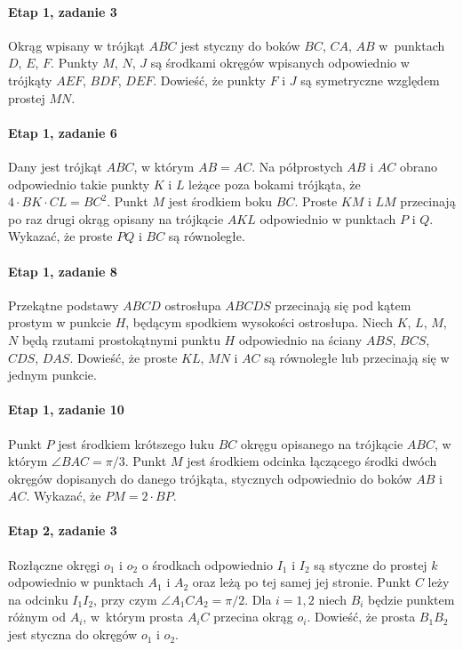 
\paragraph{Etap 1, zadanie 3}
Okrąg wpisany w trójkąt $ABC$ jest styczny do boków $BC$, $CA$, $AB$ w~punktach $D$, $E$, $F$.
Punkty $M$, $N$, $J$ są środkami okręgów wpisanych odpowiednio w trójkąty $AEF$, $BDF$, $DEF$.
Dowieść, że punkty $F$ i $J$ są symetryczne względem prostej $MN$.

\paragraph{Etap 1, zadanie 6}
Dany jest trójkąt $ABC$, w którym $AB = AC$. Na półprostych $AB$ i $AC$ obrano odpowiednio takie punkty $K$ i $L$ leżące poza bokami trójkąta, że $4 \cdot BK \cdot CL = BC^2$.
Punkt $M$ jest środkiem boku $BC$.
Proste $KM$ i $LM$ przecinają po raz drugi okrąg opisany na trójkącie $AKL$ odpowiednio w punktach $P$ i $Q$.
Wykazać, że proste $PQ$ i $BC$ są równoległe.

\paragraph{Etap 1, zadanie 8}
Przekątne podstawy $ABCD$ ostrosłupa $ABCDS$ przecinają się pod kątem prostym w punkcie $H$, będącym spodkiem wysokości ostrosłupa.
Niech $K$, $L$, $M$, $N$ będą rzutami prostokątnymi punktu $H$ odpowiednio na ściany $ABS$, $BCS$, $CDS$, $DAS$.
Dowieść, że proste $KL$, $MN$ i $AC$ są równoległe lub przecinają się w jednym punkcie.

\paragraph{Etap 1, zadanie 10}
Punkt $P$ jest środkiem krótszego łuku $BC$ okręgu opisanego na trójkącie $ABC$, w którym $\angle BAC = \pi/3$.
Punkt $M$ jest środkiem odcinka łączącego środki dwóch okręgów dopisanych do danego trójkąta, stycznych odpowiednio do boków $AB$ i $AC$. Wykazać, że $PM = 2 \cdot BP$.

\paragraph{Etap 2, zadanie 3}
Rozłączne okręgi $o_1$ i $o_2$ o środkach odpowiednio $I_1$ i $I_2$ są styczne do prostej $k$ odpowiednio w punktach $A_1$ i $A_2$ oraz leżą po tej samej jej stronie.
Punkt $C$ leży na odcinku $I_1I_2$, przy czym $\angle A_1 C A_2 = \pi/2$.
Dla $i = 1, 2$ niech $B_i$ będzie punktem różnym od $A_i$, w~którym prosta $A_iC$ przecina okrąg $o_i$.
Dowieść, że prosta $B_1B_2$ jest styczna do okręgów $o_1$ i $o_2$.

